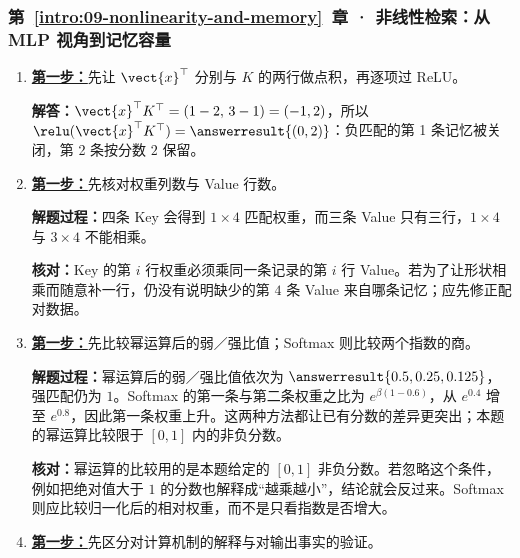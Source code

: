 \subsubsection*{第~\ref*{intro:09-nonlinearity-and-memory}~章 · 非线性检索：从 MLP 视角到记忆容量}
\begin{enumerate}[label={},leftmargin=4.8em,itemsep=4pt]
\item[\textbf{C-129.}] \leavevmode{}\label{solution:C-129}\label{solution:memory-relu-read}\hyperref[exercise:memory-relu-read]{\textbf{第一步：}}先让 $\vect{x}^\top$ 分别与 $K$ 的两行做点积，再逐项过 ReLU。\par\nobreak
\textbf{解答：}$\vect{x}^\top K^\top=(1-2,\,3-1)=(-1,2)$，所以 $\relu(\vect{x}^\top K^\top)=\answerresult{(0,2)}$：负匹配的第 1 条记忆被关闭，第 2 条按分数 $2$ 保留。
\item[\textbf{C-130.}] \leavevmode{}\label{solution:C-130}\label{solution:memory-pairing-shape}\hyperref[exercise:memory-pairing-shape]{\textbf{第一步：}}先核对权重列数与 Value 行数。\par\nobreak\textbf{解题过程：}四条 Key 会得到 $1\times4$ 匹配权重，而三条 Value 只有三行，$1\times4$ 与 $3\times4$ 不能相乘。\par\textbf{核对：}Key 的第 $i$ 行权重必须乘同一条记录的第 $i$ 行 Value。若为了让形状相乘而随意补一行，仍没有说明缺少的第 $4$ 条 Value 来自哪条记忆；应先修正配对数据。
\item[\textbf{C-131.}] \leavevmode{}\label{solution:C-131}\label{solution:memory-selectivity}\hyperref[exercise:memory-selectivity]{\textbf{第一步：}}先比较幂运算后的弱／强比值；Softmax 则比较两个指数的商。\par\nobreak
\textbf{解题过程：}幂运算后的弱／强比值依次为 $\answerresult{0.5,0.25,0.125}$，强匹配仍为 $1$。Softmax 的第一条与第二条权重之比为 $e^{\beta(1-0.6)}$，从 $e^{0.4}$ 增至 $e^{0.8}$，因此第一条权重上升。这两种方法都让已有分数的差异更突出；本题的幂运算比较限于 $[0,1]$ 内的非负分数。\par\textbf{核对：}幂运算的比较用的是本题给定的 $[0,1]$ 非负分数。若忽略这个条件，例如把绝对值大于 $1$ 的分数也解释成“越乘越小”，结论就会反过来。Softmax 则应比较归一化后的相对权重，而不是只看指数是否增大。
\item[\textbf{C-132.}] \leavevmode{}\label{solution:C-132}\label{solution:memory-mlp-interpretation}\hyperref[exercise:memory-mlp-interpretation]{\textbf{第一步：}}先区分对计算机制的解释与对输出事实的验证。\par\nobreak

\end{enumerate}
